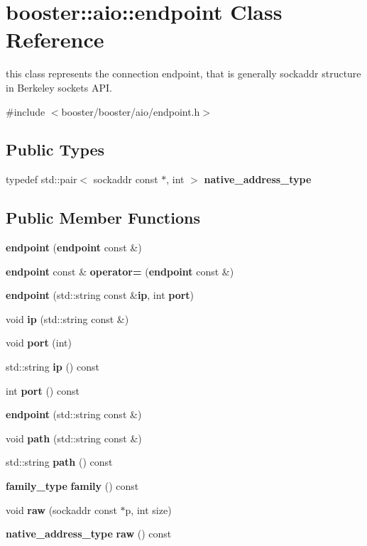 \section{booster\+:\+:aio\+:\+:endpoint Class Reference}
\label{classbooster_1_1aio_1_1endpoint}


this class represents the connection endpoint, that is generally sockaddr structure in Berkeley sockets A\+PI.  




{\ttfamily \#include $<$booster/booster/aio/endpoint.\+h$>$}

\subsection*{Public Types}
\begin{DoxyCompactItemize}
\item 
typedef std\+::pair$<$ sockaddr const $\ast$, int $>$ {\bf native\+\_\+address\+\_\+type}
\end{DoxyCompactItemize}
\subsection*{Public Member Functions}
\begin{DoxyCompactItemize}
\item 
{\bfseries endpoint} ({\bf endpoint} const \&)\label{classbooster_1_1aio_1_1endpoint_ae1799d20f79db212429f0340219d2330}

\item 
{\bf endpoint} const \& {\bfseries operator=} ({\bf endpoint} const \&)\label{classbooster_1_1aio_1_1endpoint_afe01e7f2f33961141d32e341c4aba36f}

\item 
{\bf endpoint} (std\+::string const \&{\bf ip}, int {\bf port})
\item 
void {\bf ip} (std\+::string const \&)
\item 
void {\bf port} (int)
\item 
std\+::string {\bf ip} () const 
\item 
int {\bf port} () const 
\item 
{\bf endpoint} (std\+::string const \&)
\item 
void {\bf path} (std\+::string const \&)
\item 
std\+::string {\bf path} () const 
\item 
{\bf family\+\_\+type} {\bf family} () const 
\item 
void {\bf raw} (sockaddr const $\ast$p, int size)
\item 
{\bf native\+\_\+address\+\_\+type} {\bf raw} () const 
\end{DoxyCompactItemize}


